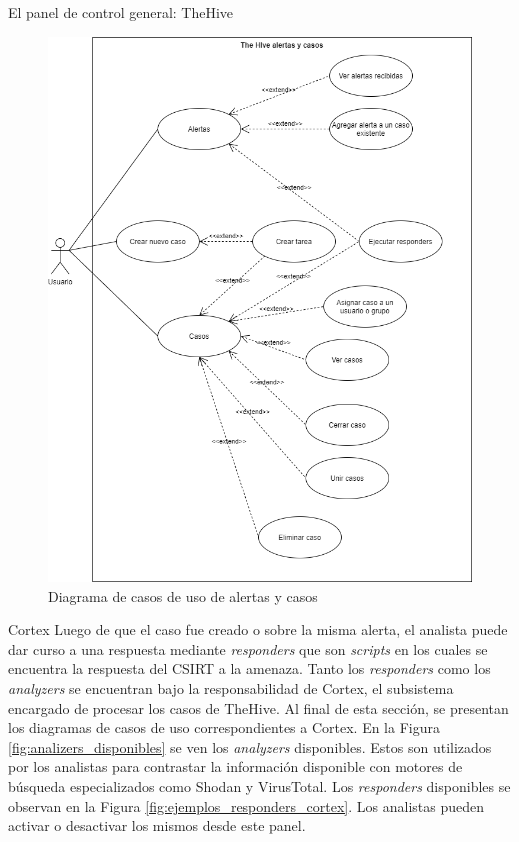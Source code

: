 \begin{section}{El panel de control general: TheHive }
\begin{figure}[H]
        \includegraphics[width=1\textwidth]{./descripcion_sonion_imagenes/figura_29_thehive_alertas_casos.png}
        \caption{Diagrama de casos de uso de alertas y casos}
        \label{fig:caso_de_uso_alertas_casos}
     \end{figure}
     \pagebreak
     \begin{subsection}{Cortex}
     \label{ref-cortex}
        Luego de que el caso fue creado o sobre la misma alerta, el analista puede dar curso a una respuesta mediante \textit{responders} que son \textit{scripts} en los cuales se encuentra la respuesta del CSIRT a la amenaza. Tanto los \textit{responders} como los \textit{analyzers} se encuentran bajo la responsabilidad de Cortex, el subsistema encargado de procesar los casos de TheHive. Al final de esta sección, se presentan los diagramas de casos de uso correspondientes a Cortex.
        En la Figura \ref{fig:analizers_disponibles} se ven los \textit{analyzers} disponibles. Estos son utilizados por los analistas para contrastar la información disponible con motores de búsqueda especializados como Shodan y VirusTotal. Los \textit{responders} disponibles se observan en la Figura \ref{fig:ejemplos_responders_cortex}. Los analistas pueden activar o desactivar los mismos desde este panel.

\end{subsection}
\end{section}
